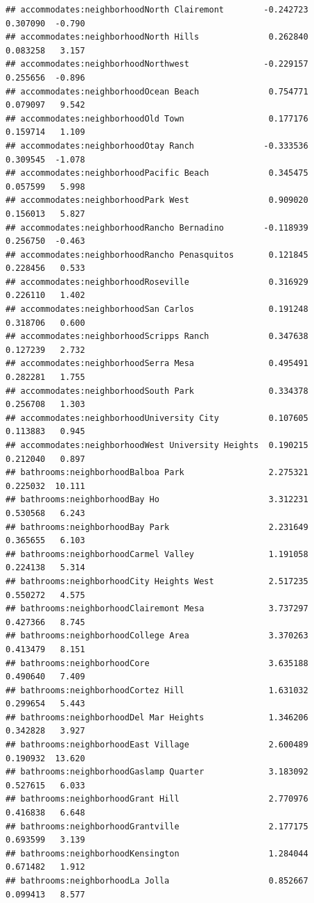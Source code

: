 \documentclass[
]{book}
\begin{document}
\begin{verbatim}
## accommodates:neighborhoodNorth Clairemont        -0.242723   0.307090  -0.790
## accommodates:neighborhoodNorth Hills              0.262840   0.083258   3.157
## accommodates:neighborhoodNorthwest               -0.229157   0.255656  -0.896
## accommodates:neighborhoodOcean Beach              0.754771   0.079097   9.542
## accommodates:neighborhoodOld Town                 0.177176   0.159714   1.109
## accommodates:neighborhoodOtay Ranch              -0.333536   0.309545  -1.078
## accommodates:neighborhoodPacific Beach            0.345475   0.057599   5.998
## accommodates:neighborhoodPark West                0.909020   0.156013   5.827
## accommodates:neighborhoodRancho Bernadino        -0.118939   0.256750  -0.463
## accommodates:neighborhoodRancho Penasquitos       0.121845   0.228456   0.533
## accommodates:neighborhoodRoseville                0.316929   0.226110   1.402
## accommodates:neighborhoodSan Carlos               0.191248   0.318706   0.600
## accommodates:neighborhoodScripps Ranch            0.347638   0.127239   2.732
## accommodates:neighborhoodSerra Mesa               0.495491   0.282281   1.755
## accommodates:neighborhoodSouth Park               0.334378   0.256708   1.303
## accommodates:neighborhoodUniversity City          0.107605   0.113883   0.945
## accommodates:neighborhoodWest University Heights  0.190215   0.212040   0.897
## bathrooms:neighborhoodBalboa Park                 2.275321   0.225032  10.111
## bathrooms:neighborhoodBay Ho                      3.312231   0.530568   6.243
## bathrooms:neighborhoodBay Park                    2.231649   0.365655   6.103
## bathrooms:neighborhoodCarmel Valley               1.191058   0.224138   5.314
## bathrooms:neighborhoodCity Heights West           2.517235   0.550272   4.575
## bathrooms:neighborhoodClairemont Mesa             3.737297   0.427366   8.745
## bathrooms:neighborhoodCollege Area                3.370263   0.413479   8.151
## bathrooms:neighborhoodCore                        3.635188   0.490640   7.409
## bathrooms:neighborhoodCortez Hill                 1.631032   0.299654   5.443
## bathrooms:neighborhoodDel Mar Heights             1.346206   0.342828   3.927
## bathrooms:neighborhoodEast Village                2.600489   0.190932  13.620
## bathrooms:neighborhoodGaslamp Quarter             3.183092   0.527615   6.033
## bathrooms:neighborhoodGrant Hill                  2.770976   0.416838   6.648
## bathrooms:neighborhoodGrantville                  2.177175   0.693599   3.139
## bathrooms:neighborhoodKensington                  1.284044   0.671482   1.912
## bathrooms:neighborhoodLa Jolla                    0.852667   0.099413   8.577

\end{verbatim}
\end{document}
